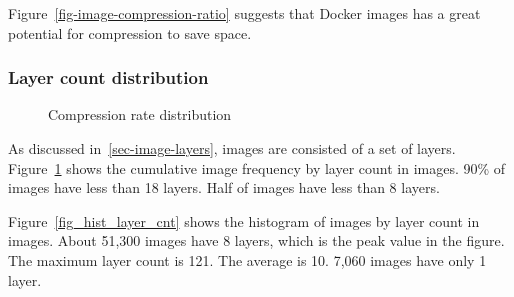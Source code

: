 Figure~\ref{fig-image-compression-ratio} suggests that Docker images has a great potential for compression to save space.

\subsubsection{Layer count distribution}

\begin{figure}[!t]
	\centering
	\caption{Compression rate distribution}
	\label{fig-layer-cnt}
\end{figure}

As discussed in~\ref{sec-image-layers}, images are consisted of a set of layers. Figure~\ref{fig-layer-cnt} shows the cumulative image frequency by layer count in images. 90\% of images have less than 18 layers. Half of images have less than 8 layers. 

Figure~\ref{fig_hist_layer_cnt} shows the histogram of images by layer count in images. About 51,300 images have 8 layers, which is the peak value in the figure. The maximum layer count is 121. The average is 10. 7,060 images have only 1 layer. 


